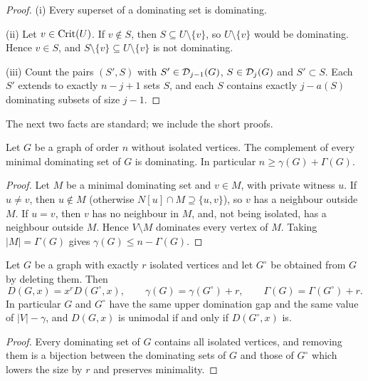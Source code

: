\begin{proof}
(i) Every superset of a dominating set is dominating.

(ii) Let $v\in\operatorname{Crit}(U)$. If $v\notin S$, then $S\subseteq U\setminus\{v\}$,
so $U\setminus\{v\}$ would be dominating. Hence $v\in S$, and
$S\setminus\{v\}\subseteq U\setminus\{v\}$ is not dominating.

(iii) Count the pairs $(S',S)$ with $S'\in\mathcal{D}_{j-1}(G)$, $S\in\mathcal{D}_j(G)$ and
$S'\subset S$. Each $S'$ extends to exactly $n-j+1$ sets $S$, and each $S$
contains exactly $j-a(S)$ dominating subsets of size $j-1$.
\end{proof}

The next two facts are standard; we include the short proofs.

\begin{lemma}\label{lem:ore}
Let $G$ be a graph of order $n$ without isolated vertices. The complement of
every minimal dominating set of $G$ is dominating. In particular
$n\ge\gamma(G)+\Gamma(G)$.
\end{lemma}

\begin{proof}
Let $M$ be a minimal dominating set and $v\in M$, with private witness $u$.
If $u\ne v$, then $u\notin M$ (otherwise $N[u]\cap M\supseteq\{u,v\}$), so
$v$ has a neighbour outside $M$. If $u=v$, then $v$ has no neighbour in $M$,
and, not being isolated, has a neighbour outside $M$. Hence $V\setminus M$
dominates every vertex of $M$. Taking $|M|=\Gamma(G)$ gives
$\gamma(G)\le n-\Gamma(G)$.
\end{proof}

\begin{lemma}\label{lem:isolates}
Let $G$ be a graph with exactly $r$ isolated vertices and let $G^{\circ}$ be
obtained from $G$ by deleting them. Then
\[
  D(G,x)=x^{r}D(G^{\circ},x),\qquad \gamma(G)=\gamma(G^{\circ})+r,\qquad
  \Gamma(G)=\Gamma(G^{\circ})+r .
\]
In particular $G$ and $G^{\circ}$ have the same upper domination gap and the
same value of $|V|-\gamma$, and $D(G,x)$ is unimodal if and only if
$D(G^{\circ},x)$ is.
\end{lemma}

\begin{proof}
Every dominating set of $G$ contains all isolated vertices, and removing them
is a bijection between the dominating sets of $G$ and those of $G^{\circ}$
which lowers the size by $r$ and preserves minimality.
\end{proof}

